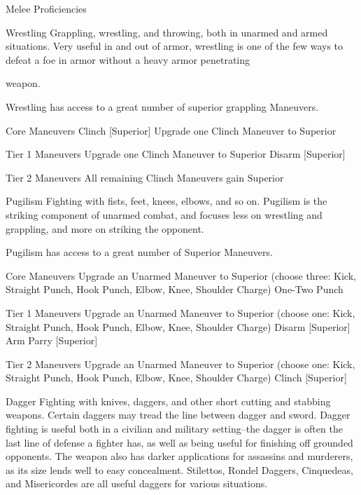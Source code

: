 \documentclass[oneside,11pt,english]{book}
\begin{document}
 

Melee Proficiencies 

 

Wrestling 
Grappling, wrestling, and throwing, both in unarmed and armed situations. Very useful in and out of 
armor, wrestling is one of the few ways to defeat a foe in armor without a heavy armor penetrating 


weapon. 

 

Wrestling has access to a great number of superior grappling Maneuvers. 

 

Core Maneuvers 
Clinch [Superior] 
Upgrade one Clinch Maneuver to Superior 

 

Tier 1 Maneuvers 
Upgrade one Clinch Maneuver to Superior 
Disarm [Superior] 

 

Tier 2 Maneuvers 
All remaining Clinch Maneuvers gain Superior 

 

Pugilism 
Fighting with fists, feet, knees, elbows, and so on. Pugilism is the striking component of unarmed combat, 
and focuses less on wrestling and grappling, and more on striking the opponent. 

 

Pugilism has access to a great number of Superior Maneuvers. 

 

Core Maneuvers 
Upgrade an Unarmed Maneuver to Superior (choose three: Kick, Straight Punch, Hook Punch, 
Elbow, Knee, Shoulder Charge) 
One-Two Punch 

 

Tier 1 Maneuvers 
Upgrade an Unarmed Maneuver to Superior (choose one: Kick, Straight Punch, Hook Punch, 
Elbow, Knee, Shoulder Charge) 
Disarm [Superior] 
Arm Parry [Superior] 

 

Tier 2 Maneuvers 
Upgrade an Unarmed Maneuver to Superior (choose one: Kick, Straight Punch, Hook Punch, 
Elbow, Knee, Shoulder Charge) 
Clinch [Superior] 

 

Dagger 
Fighting with knives, daggers, and other short cutting and stabbing weapons. Certain daggers may tread 
the line between dagger and sword. Dagger fighting is useful both in a civilian and military setting--the 
dagger is often the last line of defense a fighter has, as well as being useful for finishing off grounded 
opponents. The weapon also has darker applications for assassins and murderers, as its size lends well to 
easy concealment. Stilettos, Rondel Daggers, Cinquedeas, and Misericordes are all useful daggers for 
various situations. 
\end{document}
